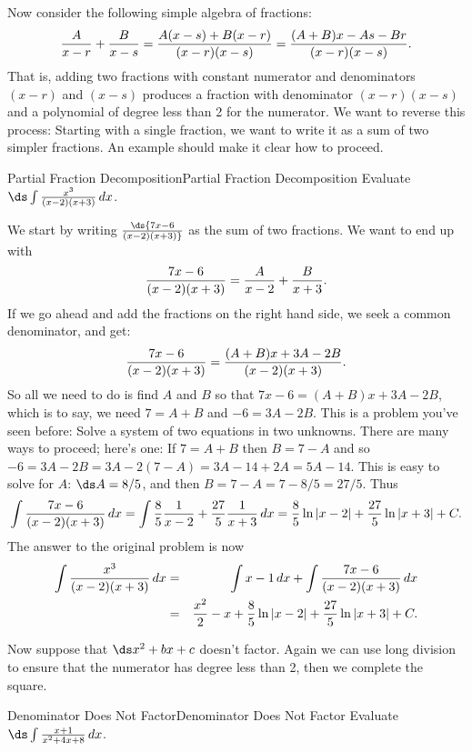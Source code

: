 Now consider the following simple algebra of fractions:
$$
  {A\over x-r}+{B\over x-s}={A(x-s)+B(x-r)\over (x-r)(x-s)}=
  {(A+B)x-As-Br\over (x-r)(x-s)}.
$$
That is, adding two fractions with constant numerator and denominators
$(x-r)$ and $(x-s)$ produces a fraction with denominator $(x-r)(x-s)$
and a polynomial of degree less than 2 for the numerator. We want to
reverse this process: Starting with a single fraction, we want to
write it as a sum of two simpler fractions. An example should make it
clear how to proceed.

\begin{example}{Partial Fraction Decomposition}{Partial Fraction Decomposition}\label{Partial Fraction Decomposition} 
Evaluate $\ds\int {x^3\over (x-2)(x+3)}\,dx$. 
\end{example}

\begin{solution}
We start by
writing $\ds{7x-6\over (x-2)(x+3)}$ as the sum of two fractions.  We
want to end up with
$${7x-6\over (x-2)(x+3)}={A\over x-2}+{B\over x+3}.$$
If we go ahead and add the fractions on the right hand side, we seek a common denominator, and get:
$${7x-6\over (x-2)(x+3)}={(A+B)x+3A-2B\over (x-2)(x+3)}.$$
So all we need to do is find $A$ and $B$ so that $7x-6=(A+B)x+3A-2B$,
which is to say, we need $7=A+B$ and $-6=3A-2B$. This is a problem
you've seen before: Solve a system of two equations in two
unknowns. There are many ways to proceed; here's one: If $7=A+B$ then
$B=7-A$ and so $-6=3A-2B=3A-2(7-A)=3A-14+2A=5A-14$. This is easy to
solve for $A$: $\ds A= 8/5$, and then $B=7-A=7-8/5=27/5$. Thus
$$
  \int {7x-6\over (x-2)(x+3)}\,dx=
  \int {8\over5}{1\over x-2}+{27\over5}{1\over x+3}\,dx=
  {8\over5}\ln |x-2|+{27\over5}\ln|x+3|+C.
$$
The answer to the original problem is now
\begin{eqnarray*}
  \int {x^3\over (x-2)(x+3)}\,dx
  &=&\int x-1\,dx +\int {7x-6\over (x-2)(x+3)}\,dx\cr
  &=&{x^2\over 2}-x+{8\over5}\ln |x-2|+{27\over5}\ln|x+3|+C.\cr
\end{eqnarray*}
\vskip-10pt
\end{solution}

Now suppose that $\ds x^2+bx+c$ doesn't factor. Again we can use long
division to ensure that the numerator has degree less than 2, then we
complete the square.

\begin{example}{Denominator Does Not Factor}{Denominator Does Not Factor}\label{Denominator Does Not Factor} 
Evaluate $\ds\int {x+1\over x^2+4x+8}\,dx$. 
\end{example}

